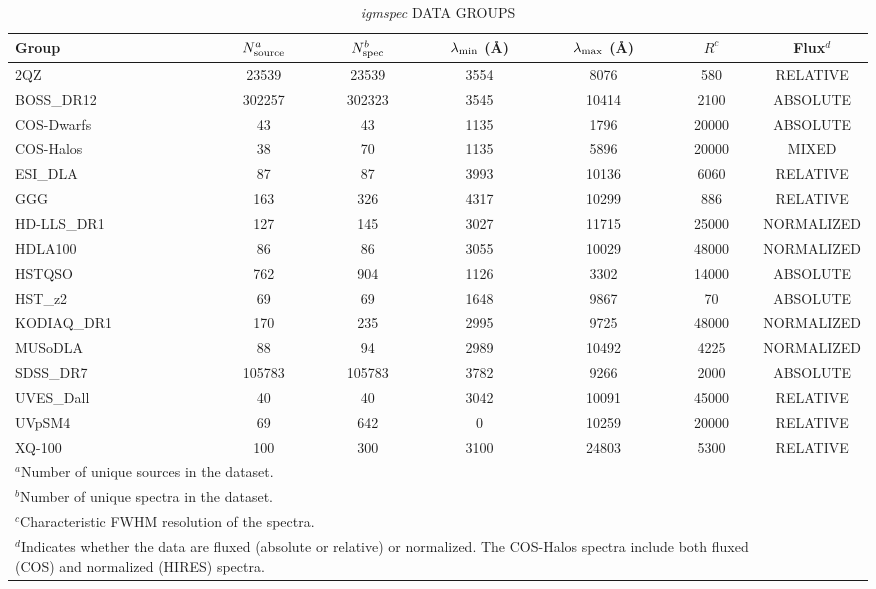 \clearpage
\begin{table}[ht]
\caption{{\it igmspec} DATA GROUPS \label{tab:datasets}}
\begin{tabular}{lcccccc}
Group & $N_{\rm source}^a$ 
& $N_{\rm spec}^b$ & $\lambda_{\rm min}$ (\AA) 
& $\lambda_{\rm max}$ (\AA) & $R^c$  & Flux$^d$\\ 
\hline 
2QZ& 23539& 23539& 3554& 8076& 580& RELATIVE\\ 
BOSS\_DR12& 302257& 302323& 3545& 10414& 2100& ABSOLUTE\\ 
COS-Dwarfs& 43& 43& 1135& 1796& 20000& ABSOLUTE\\ 
COS-Halos& 38& 70& 1135& 5896& 20000& MIXED\\ 
ESI\_DLA& 87& 87& 3993& 10136& 6060& RELATIVE\\ 
GGG& 163& 326& 4317& 10299& 886& RELATIVE\\ 
HD-LLS\_DR1& 127& 145& 3027& 11715& 25000& NORMALIZED\\ 
HDLA100& 86& 86& 3055& 10029& 48000& NORMALIZED\\ 
HSTQSO& 762& 904& 1126& 3302& 14000& ABSOLUTE\\ 
HST\_z2& 69& 69& 1648& 9867& 70& ABSOLUTE\\ 
KODIAQ\_DR1& 170& 235& 2995& 9725& 48000& NORMALIZED\\ 
MUSoDLA& 88& 94& 2989& 10492& 4225& NORMALIZED\\ 
SDSS\_DR7& 105783& 105783& 3782& 9266& 2000& ABSOLUTE\\ 
UVES\_Dall& 40& 40& 3042& 10091& 45000& RELATIVE\\ 
UVpSM4& 69& 642& 0& 10259& 20000& RELATIVE\\ 
XQ-100& 100& 300& 3100& 24803& 5300& RELATIVE\\ 
\hline 
\multicolumn{6}{l}{{$^a$}{Number of unique sources in the dataset. }} \\ 
\multicolumn{6}{l}{{$^b$}{Number of unique spectra in the dataset. }} \\ 
\multicolumn{6}{l}{{$^c$}{Characteristic FWHM resolution of the spectra. }} \\ 
\multicolumn{6}{l}{{$^d$}{Indicates whether the data are fluxed (absolute or relative) or normalized. The COS-Halos spectra include both fluxed (COS) and normalized (HIRES) spectra.}} \\ 
\end{tabular} 
\end{table} 
